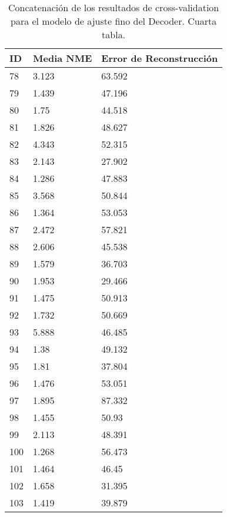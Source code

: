 \begin{table}[!ht]
    \centering
    \caption{Concatenación de los resultados de cross-validation para el modelo de ajuste fino del Decoder. Cuarta tabla.}
    \begin{tabular}{|l|l|l|}
    \hline
    \cellcolor{gray!25}\textbf{ID} & \cellcolor{gray!25}\textbf{Media NME} & \cellcolor{gray!25}\textbf{Error de Reconstrucción} \\ \hline
        78 & 3.123 & 63.592 \\ \hline
        79 & 1.439 & 47.196 \\ \hline
        80 & 1.75 & 44.518 \\ \hline
        81 & 1.826 & 48.627 \\ \hline
        82 & 4.343 & 52.315 \\ \hline
        83 & 2.143 & 27.902 \\ \hline
        84 & 1.286 & 47.883 \\ \hline
        85 & 3.568 & 50.844 \\ \hline
        86 & 1.364 & 53.053 \\ \hline
        87 & 2.472 & 57.821 \\ \hline
        88 & 2.606 & 45.538 \\ \hline
        89 & 1.579 & 36.703 \\ \hline
        90 & 1.953 & 29.466 \\ \hline
        91 & 1.475 & 50.913 \\ \hline
        92 & 1.732 & 50.669 \\ \hline
        93 & 5.888 & 46.485 \\ \hline
        94 & 1.38 & 49.132 \\ \hline
        95 & 1.81 & 37.804 \\ \hline
        96 & 1.476 & 53.051 \\ \hline
        97 & 1.895 & 87.332 \\ \hline
        98 & 1.455 & 50.93 \\ \hline
        99 & 2.113 & 48.391 \\ \hline
        100 & 1.268 & 56.473 \\ \hline
        101 & 1.464 & 46.45 \\ \hline
        102 & 1.658 & 31.395 \\ \hline
        103 & 1.419 & 39.879 \\ \hline
    \end{tabular}
\end{table}

